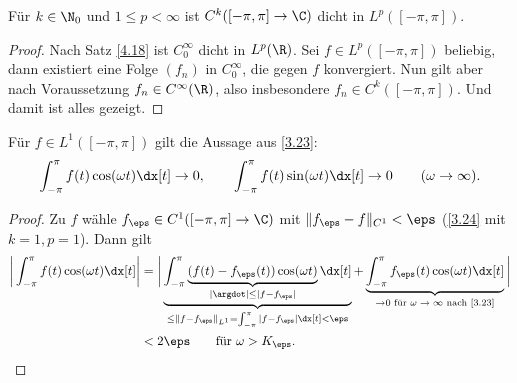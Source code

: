\begin{lem} \label{3.24}
	Für $k \in \N_0$ und $1 \le p < \infty$ ist $C^k([-\pi, \pi] \to \C)$ dicht in $L^p([-\pi, \pi])$.
	\begin{proof}
		Nach Satz \ref{4.18} ist $C_0^\infty$ dicht in $L^p(\R)$. Sei $f\in L^p([-\pi,\pi])$ beliebig, dann existiert eine Folge $(f_n)$ in $C_0^\infty$, 
		die gegen $f$ konvergiert. Nun gilt aber nach Voraussetzung $f_n\in C^\infty(\R)$, also insbesondere $f_n \in C^k([-\pi,\pi])$. 
		Und damit ist alles gezeigt.
	\end{proof}
\end{lem}

\begin{st} \label{3.25}
	Für $f \in L^1([-\pi, \pi])$ gilt die Aussage aus \ref{3.23}:
	\[
		\int_{-\pi}^{\pi} f(t) \cos(\omega t) \dx[t] \to 0, \qquad
		\int_{-\pi}^{\pi} f(t) \sin(\omega t) \dx[t] \to 0 \qquad (\omega \to \infty).
	\]
	\begin{proof}
		Zu $f$ wähle $f_\eps \in C^1 ([-\pi,\pi] \to \C)$ mit $\|f_\eps - f\|_{C^1} < \eps$ (\ref{3.24} mit $k=1, p=1$).
		Dann gilt
		\begin{align*}
			\bigg|\int_{-\pi}^{\pi} f(t) \cos(\omega t) \dx[t] \bigg|
			&= \bigg| \underbrace{\int_{-\pi}^{\pi} \underbrace{(f(t) - f_\eps(t)) \cos(\omega t)}_{|\argdot| \le |f-f_\eps|} \dx[t]}_{\le \|f - f_\eps\|_{L^1} = \int_{-\pi}^\pi |f-f_\eps| \dx[t] < \eps} + \underbrace{\int_{-\pi}^{\pi} f_\eps (t) \cos(\omega t) \dx[t]}_{\to 0 \text{ für $\omega \to \infty$ nach \ref{3.23}}} \bigg| \\
			&< 2\eps \qquad \text{für $\omega > K_\eps$.}
		\end{align*}
	\end{proof}
\end{st}

